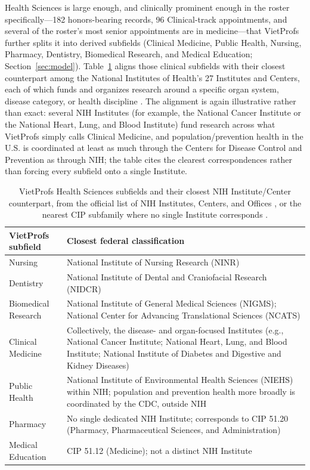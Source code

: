 \documentclass[11pt]{article}
\begin{document}
Health Sciences is large enough, and clinically prominent enough in the roster specifically---182 honors-bearing records, 96 Clinical-track appointments, and several of the roster's most senior appointments are in medicine---that VietProfs further splits it into derived subfields (Clinical Medicine, Public Health, Nursing, Pharmacy, Dentistry, Biomedical Research, and Medical Education; Section~\ref{sec:model}).
Table~\ref{tab:healthnih} aligns those clinical subfields with their closest counterpart among the National Institutes of Health's 27 Institutes and Centers, each of which funds and organizes research around a specific organ system, disease category, or health discipline \cite{nih_ics}.
The alignment is again illustrative rather than exact: several NIH Institutes (for example, the National Cancer Institute or the National Heart, Lung, and Blood Institute) fund research across what VietProfs simply calls Clinical Medicine, and population/prevention health in the U.S. is coordinated at least as much through the Centers for Disease Control and Prevention as through NIH; the table cites the clearest correspondences rather than forcing every subfield onto a single Institute.

\begin{table}[t]
\centering
\caption{VietProfs Health Sciences subfields and their closest NIH Institute/Center counterpart, from
the official list of NIH Institutes, Centers, and Offices \cite{nih_ics}, or the nearest CIP
subfamily where no single Institute corresponds \cite{nces_cip2020}.}
\label{tab:healthnih}
\small
\begin{tabularx}{\linewidth}{@{}lX@{}}
\toprule
VietProfs subfield & Closest federal classification \\
\midrule
Nursing & National Institute of Nursing Research (NINR) \\
Dentistry & National Institute of Dental and Craniofacial Research (NIDCR) \\
Biomedical Research & National Institute of General Medical Sciences (NIGMS); National Center for
Advancing Translational Sciences (NCATS) \\
Clinical Medicine & Collectively, the disease- and organ-focused Institutes (e.g., National Cancer
Institute; National Heart, Lung, and Blood Institute; National Institute of Diabetes and Digestive
and Kidney Diseases) \\
Public Health & National Institute of Environmental Health Sciences (NIEHS) within NIH; population
and prevention health more broadly is coordinated by the CDC, outside NIH \\
Pharmacy & No single dedicated NIH Institute; corresponds to CIP 51.20 (Pharmacy, Pharmaceutical
Sciences, and Administration) \\
Medical Education & CIP 51.12 (Medicine); not a distinct NIH Institute \\
\bottomrule
\end{tabularx}
\end{table}
\end{document}
